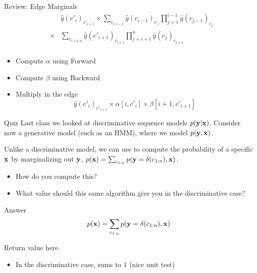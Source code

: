 \documentclass{beamer}
\begin{document}
\begin{frame}{Review: Edge Marginals}
  \begin{eqnarray*}
    && \hat{y}(c'_{i})_{c'_{i+1}} \times \sum_{c_{1:i-1}} \hat{y}(c_{i-1})_{c'_{i}}  \prod_{j=1}^{i-1} \hat{y}(c_{j-1})_{c_{j}}  \\
     &\times& \sum_{c_{i+2:n}}  \hat{y}(c'_{i+1})_{c_{i+1}} \prod_{j=i+1}^n   \hat{y}(c_{j})_{c_{j+1}} \\          
  \end{eqnarray*}

  \begin{itemize}
  \item Compute $\alpha$ using Forward
    \air 

  \item Compute $\beta$ using Backward 
    \air

  \item Multiply in the edge 
    \[ \hat{y}(c'_{i})_{c'_{i+1}} \times \alpha[i, c'_i] \times \beta[i+1, c'_{i+1}] \] 
  \end{itemize}
\end{frame}


\begin{frame}{Quiz}
  Last class we looked at discriminative sequence models 
  $p(\mathbf{y} | \mathbf{x})$. Consider now a generative model (such as 
  an HMM), where we model $p(\mathbf{y}, \mathbf{x})$. 

  Unlike a discriminative model, we can use to compute the probability of a specific $\mathbf{x}$ by marginalizing out $\mathbf{y}$, $p(\mathbf{x}) = \sum_{c_{1:n}} p(\mathbf{y} = \delta(c_{1:n}), \mathbf{x})$. 


  \begin{itemize}
  \item How do you compute this?
    \air
  \item What value should this same algorithm give you in the discriminative case?
  \end{itemize}
\end{frame}

\begin{frame}{Answer}
  \[p(\mathbf{x}) = \sum_{c_{1:n}} p(\mathbf{y} = \delta(c_{1:n}), \mathbf{x})\]

  Return value here. 

  \begin{algorithmic}
    \EndFor{}
    \EndFor{}
    \EndProcedure{}
  \end{algorithmic}

  \begin{itemize}
  \item In the discriminative case, sums to $1$ (nice unit test)
  \end{itemize}
\end{frame}
\end{document}
